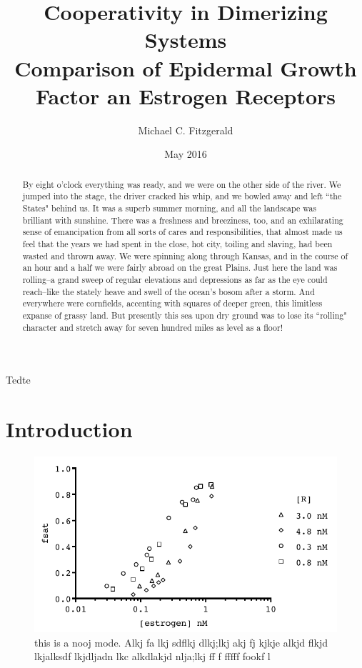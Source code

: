 \documentclass[12pt, titlepage]{article}
\begin{document}
\title{\textbf{\LARGE{Cooperativity in Dimerizing Systems}} \\[0.5em] \normalsize{Comparison of Epidermal Growth Factor an Estrogen Receptors}}
\author{Michael C. Fitzgerald}
\date{May 2016}
\maketitle

\begin{abstract}
By eight o'clock everything was ready, and we were on the other side of
the river.  We jumped into the stage, the driver cracked his whip, and we
bowled away and left ``the States" behind us.  It was a superb summer
morning, and all the landscape was brilliant with sunshine.  There was a
freshness and breeziness, too, and an exhilarating sense of emancipation
from all sorts of cares and responsibilities, that almost made us feel
that the years we had spent in the close, hot city, toiling and slaving,
had been wasted and thrown away.  We were spinning along through Kansas,
and in the course of an hour and a half we were fairly abroad on the
great Plains.  Just here the land was rolling--a grand sweep of regular
elevations and depressions as far as the eye could reach--like the
stately heave and swell of the ocean's bosom after a storm.  And
everywhere were cornfields, accenting with squares of deeper green, this
limitless expanse of grassy land.  But presently this sea upon dry ground
was to lose its ``rolling" character and stretch away for seven hundred
miles as level as a floor!
\end{abstract}
Tedte
\pagestyle{empty} %
\tableofcontents %
\clearpage %
\pagestyle{plain} %
\setcounter{page}{1} %



\section{Introduction}
\blindmathtrue
\blindtext[2]
\begin{figure}
\centering
\includegraphics{grph4.pdf}
\caption{this is a nooj mode. Alkj fa lkj sdflkj dlkj;lkj akj fj kjkje alkjd flkjd lkjalksdf lkjdljadn lkc alkdlakjd nlja;lkj ff f fffff fookf l}
\end{figure}
\end{document}
